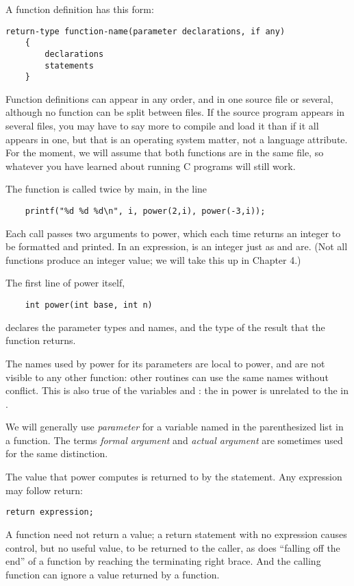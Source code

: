 A function definition has this form:
\begin{lstlisting}[basicstyle=\ttfamily\normalsize\itshape, keywordstyle=\color{black}]
	return-type function-name(parameter declarations, if any)
	{
		declarations
		statements
	}
\end{lstlisting}
Function definitions can appear in any order, and in one source file or several, although no function can be split between files.
If the source program appears in several files, you may have to say more to compile and load it than if it all appears in one, but that is an operating system matter, not a language attribute.
For the moment, we will assume that both functions are in the same file, so whatever you have learned about running C programs will still work.

The function  is called twice by main, in the line
\begin{lstlisting}
	printf("%d %d %d\n", i, power(2,i), power(-3,i));
\end{lstlisting}
Each call passes two arguments to power, which each time returns an integer to be formatted and printed.
In an expression,  is an integer just as  and  are.  (Not all functions produce an integer value; we will take this up in Chapter 4.)

The first line of power itself,
\begin{lstlisting}
	int power(int base, int n)
\end{lstlisting}
declares the parameter types and names, and the type of the result that the function returns.

The names used by power for its parameters are local to power, and are not visible to any other function: other routines can use the same names without conflict.
This is also true of the variables  and : the  in power is unrelated to the  in .

We will generally use \emph{parameter} for a variable named in the parenthesized list in a function.
The terms \emph{formal argument} and \emph{actual argument} are sometimes used for the same distinction.

The value that power computes is returned to  by the  statement.
Any expression may follow return:
\begin{lstlisting}[basicstyle=\ttfamily\normalsize\itshape, keywordstyle=\color{black}]
	return expression;
\end{lstlisting}
A function need not return a value; a return statement with no expression causes control, but no useful value, to be returned to the caller, as does ``falling off the end'' of a function by reaching the terminating right brace.
And the calling function can ignore a value returned by a function.

